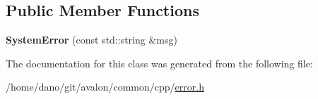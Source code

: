 \subsection*{Public Member Functions}
\begin{DoxyCompactItemize}
\item 
\mbox{\label{classtcf_1_1error_1_1SystemError_adf593f5b3c8a183d201f0911fa2c9c4e}} 
{\bfseries System\+Error} (const std\+::string \&msg)
\end{DoxyCompactItemize}


The documentation for this class was generated from the following file\+:\begin{DoxyCompactItemize}
\item 
/home/dano/git/avalon/common/cpp/\hyperlink{error_8h}{error.\+h}\end{DoxyCompactItemize}
